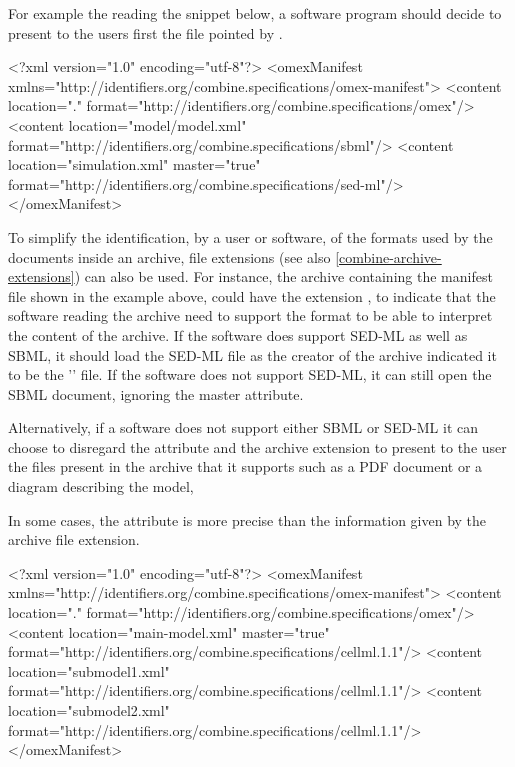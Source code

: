 For example the reading the snippet below, a software program should decide to present to the users first the file pointed by  .

\begin{example}
<?xml version="1.0" encoding="utf-8"?>
<omexManifest xmlns="http://identifiers.org/combine.specifications/omex-manifest">
    <content location="." format="http://identifiers.org/combine.specifications/omex"/>
    <content location="model/model.xml" 
        format="http://identifiers.org/combine.specifications/sbml"/>
    <content location="simulation.xml" master="true"
        format="http://identifiers.org/combine.specifications/sed-ml"/>
</omexManifest>
\end{example}

To simplify the identification, by a user or software, of the formats used by the documents inside an archive, file extensions 
(see also \ref{combine-archive-extensions}) can also be used. For instance, the archive containing the manifest file shown in the example above, could have the extension , to indicate that the software reading the archive need
to support the  format to be able to interpret the content of the archive. If the software
does support SED-ML as well as SBML, it should load the SED-ML file as the creator of the archive indicated
it to be the '' file. If the software does not support SED-ML, it can still open the SBML document, ignoring
the master attribute.

Alternatively, if a software does not support either SBML or SED-ML it can choose to disregard the  attribute and the archive extension to present to the user the files present in the archive that it supports such as a PDF document or a diagram describing the model, 

In some cases, the  attribute is more precise than the information given by the archive file
extension.


\begin{example}
<?xml version="1.0" encoding="utf-8"?>
<omexManifest xmlns="http://identifiers.org/combine.specifications/omex-manifest">
    <content location="." 
        format="http://identifiers.org/combine.specifications/omex"/>
    <content location="main-model.xml" master="true"
        format="http://identifiers.org/combine.specifications/cellml.1.1"/>
    <content location="submodel1.xml" 
        format="http://identifiers.org/combine.specifications/cellml.1.1"/>
    <content location="submodel2.xml" 
        format="http://identifiers.org/combine.specifications/cellml.1.1"/>
</omexManifest>
\end{example}

